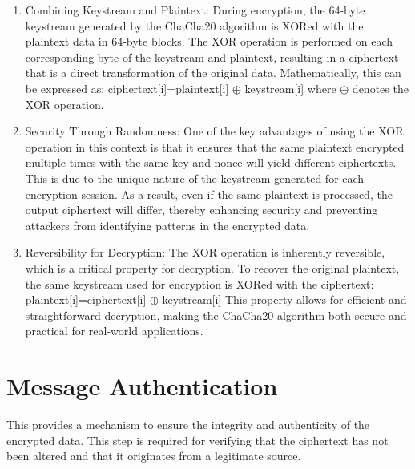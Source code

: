 \documentclass[a4paper,12pt]{report}
\begin{document}
\begin{enumerate}
    \begin{enumerate}
    \item Combining Keystream and Plaintext: During encryption, the 64-byte keystream generated by the ChaCha20 algorithm is XORed with the plaintext data in 64-byte blocks.
    The XOR operation is performed on each corresponding byte of the keystream and plaintext, resulting in a ciphertext that is a direct transformation of the original data.
    Mathematically, this can be expressed as:
    ciphertext[i]=plaintext[i] $\oplus$ keystream[i]
    where $\oplus$ denotes the XOR operation.
    \item Security Through Randomness: One of the key advantages of using the XOR operation in this context is that it ensures that the same plaintext encrypted multiple times with the same key and nonce will yield different ciphertexts.
    This is due to the unique nature of the keystream generated for each encryption session.
    As a result, even if the same plaintext is processed, the output ciphertext will differ, thereby enhancing security and preventing attackers from identifying patterns in the encrypted data.
    \item Reversibility for Decryption: The XOR operation is inherently reversible, which is a critical property for decryption.
    To recover the original plaintext, the same keystream used for encryption is XORed with the ciphertext:
    plaintext[i]=ciphertext[i] $\oplus$ keystream[i]
    This property allows for efficient and straightforward decryption, making the ChaCha20 algorithm both secure and practical for real-world applications.
    \end{enumerate}
\end{enumerate}

\section{Message Authentication}
    This provides a mechanism to ensure the integrity and authenticity of the encrypted data.
    This step is required for verifying that the ciphertext has not been altered and that it originates from a legitimate source.
\end{document}
